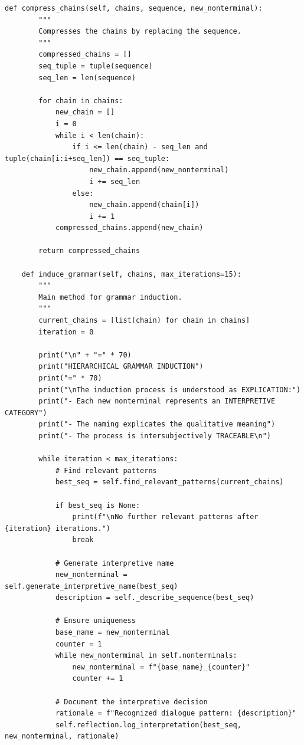 \documentclass[
  12pt,
  a4paper,
  oneside,
  titlepage
]{article}
\begin{document}
\begin{lstlisting}[caption=Algorithmic Recursive Sequence Analysis 3.0 - Hierarchical Grammar Induction]
    def compress_chains(self, chains, sequence, new_nonterminal):
        """
        Compresses the chains by replacing the sequence.
        """
        compressed_chains = []
        seq_tuple = tuple(sequence)
        seq_len = len(sequence)
        
        for chain in chains:
            new_chain = []
            i = 0
            while i < len(chain):
                if i <= len(chain) - seq_len and tuple(chain[i:i+seq_len]) == seq_tuple:
                    new_chain.append(new_nonterminal)
                    i += seq_len
                else:
                    new_chain.append(chain[i])
                    i += 1
            compressed_chains.append(new_chain)
        
        return compressed_chains
    
    def induce_grammar(self, chains, max_iterations=15):
        """
        Main method for grammar induction.
        """
        current_chains = [list(chain) for chain in chains]
        iteration = 0
        
        print("\n" + "=" * 70)
        print("HIERARCHICAL GRAMMAR INDUCTION")
        print("=" * 70)
        print("\nThe induction process is understood as EXPLICATION:")
        print("- Each new nonterminal represents an INTERPRETIVE CATEGORY")
        print("- The naming explicates the qualitative meaning")
        print("- The process is intersubjectively TRACEABLE\n")
        
        while iteration < max_iterations:
            # Find relevant patterns
            best_seq = self.find_relevant_patterns(current_chains)
            
            if best_seq is None:
                print(f"\nNo further relevant patterns after {iteration} iterations.")
                break
            
            # Generate interpretive name
            new_nonterminal = self.generate_interpretive_name(best_seq)
            description = self._describe_sequence(best_seq)
            
            # Ensure uniqueness
            base_name = new_nonterminal
            counter = 1
            while new_nonterminal in self.nonterminals:
                new_nonterminal = f"{base_name}_{counter}"
                counter += 1
            
            # Document the interpretive decision
            rationale = f"Recognized dialogue pattern: {description}"
            self.reflection.log_interpretation(best_seq, new_nonterminal, rationale)
            

\end{lstlisting}
\end{document}

